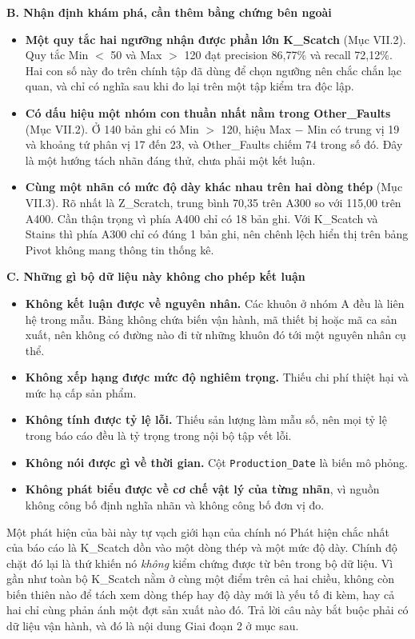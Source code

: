 \documentclass[12pt]{article}
\begin{document}
\noindent
\textbf{B. Nhận định khám phá, cần thêm bằng chứng bên ngoài}

\begin{itemize}
    \item \textbf{Một quy tắc hai ngưỡng nhận được phần lớn K\_Scatch} (Mục VII.2). Quy tắc Min $<$ 50 và Max $>$ 120 đạt precision 86,77\% và recall 72,12\%. Hai con số này đo trên chính tập đã dùng để chọn ngưỡng nên chắc chắn lạc quan, và chỉ có nghĩa sau khi đo lại trên một tập kiểm tra độc lập.

    \item \textbf{Có dấu hiệu một nhóm con thuần nhất nằm trong Other\_Faults} (Mục VII.2). Ở 140 bản ghi có Min $>$ 120, hiệu Max $-$ Min có trung vị 19 và khoảng tứ phân vị 17 đến 23, và Other\_Faults chiếm 74 trong số đó. Đây là một hướng tách nhãn đáng thử, chưa phải một kết luận.

    \item \textbf{Cùng một nhãn có mức độ dày khác nhau trên hai dòng thép} (Mục VII.3). Rõ nhất là Z\_Scratch, trung bình 70,35 trên A300 so với 115,00 trên A400. Cần thận trọng vì phía A400 chỉ có 18 bản ghi. Với K\_Scatch và Stains thì phía A300 chỉ có đúng 1 bản ghi, nên chênh lệch hiển thị trên bảng Pivot không mang thông tin thống kê.
\end{itemize}

\noindent
\textbf{C. Những gì bộ dữ liệu này không cho phép kết luận}

\begin{itemize}
    \item \textbf{Không kết luận được về nguyên nhân.} Các khuôn ở nhóm A đều là liên hệ trong mẫu. Bảng không chứa biến vận hành, mã thiết bị hoặc mã ca sản xuất, nên không có đường nào đi từ những khuôn đó tới một nguyên nhân cụ thể.
    \item \textbf{Không xếp hạng được mức độ nghiêm trọng.} Thiếu chi phí thiệt hại và mức hạ cấp sản phẩm.
    \item \textbf{Không tính được tỷ lệ lỗi.} Thiếu sản lượng làm mẫu số, nên mọi tỷ lệ trong báo cáo đều là tỷ trọng trong nội bộ tập vết lỗi.
    \item \textbf{Không nói được gì về thời gian.} Cột \texttt{Production\_Date} là biến mô phỏng.
    \item \textbf{Không phát biểu được về cơ chế vật lý của từng nhãn}, vì nguồn không công bố định nghĩa nhãn và không công bố đơn vị đo.
\end{itemize}

\begin{guidelinebox}{Một phát hiện của bài này tự vạch giới hạn của chính nó}
Phát hiện chắc nhất của báo cáo là K\_Scatch dồn vào một dòng thép và một mức độ dày. Chính độ chặt đó lại là thứ khiến nó \emph{không} kiểm chứng được từ bên trong bộ dữ liệu. Vì gần như toàn bộ K\_Scatch nằm ở cùng một điểm trên cả hai chiều, không còn biến thiên nào để tách xem dòng thép hay độ dày mới là yếu tố đi kèm, hay cả hai chỉ cùng phản ánh một đợt sản xuất nào đó. Trả lời câu này bắt buộc phải có dữ liệu vận hành, và đó là nội dung Giai đoạn 2 ở mục sau.
\end{guidelinebox}
\end{document}

